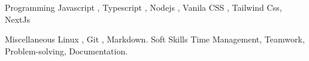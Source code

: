 

\begin{cvskills}

  \cvskill
    {Programming} %
    {Javascript , Typescript , Nodejs , Vanila CSS , Tailwind Css, NextJs} %

  \cvskill
    {Miscellaneous} %
    {Linux , Git , Markdown.} %
  \cvskill
    {Soft Skills} %
    {Time Management, Teamwork, Problem-solving, Documentation.} %

\end{cvskills}
